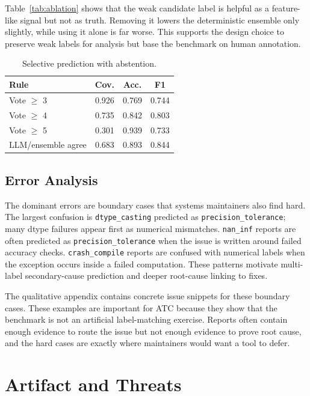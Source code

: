 \documentclass[sigplan,10pt]{acmart}
\begin{document}
Table~\ref{tab:ablation} shows that the weak candidate label is helpful as a
feature-like signal but not as truth. Removing it lowers the deterministic
ensemble only slightly, while using it alone is far worse. This supports the
design choice to preserve weak labels for analysis but base the benchmark on
human annotation.

\begin{table}[t]
\centering
\caption{Selective prediction with abstention.}
\label{tab:abstain}
\small
\begin{tabular}{@{}lccc@{}}
\toprule
Rule & Cov. & Acc. & F1 \\
\midrule
Vote $\geq$ 3 & 0.926 & 0.769 & 0.744 \\
Vote $\geq$ 4 & 0.735 & 0.842 & 0.803 \\
Vote $\geq$ 5 & 0.301 & 0.939 & 0.733 \\
LLM/ensemble agree & 0.683 & 0.893 & 0.844 \\
\bottomrule
\end{tabular}
\end{table}

\subsection{Error Analysis}

The dominant errors are boundary cases that systems maintainers also find hard.
The largest confusion is \texttt{dtype\_casting} predicted as
\texttt{precision\_tolerance}; many dtype failures appear first as numerical
mismatches. \texttt{nan\_inf} reports are often predicted as
\texttt{precision\_tolerance} when the issue is written around failed accuracy
checks. \texttt{crash\_compile} reports are confused with numerical labels when
the exception occurs inside a failed computation. These patterns motivate
multi-label secondary-cause prediction and deeper root-cause linking to fixes.

The qualitative appendix contains concrete issue snippets for these boundary
cases. These examples are important for ATC because they show that the benchmark
is not an artificial label-matching exercise. Reports often contain enough
evidence to route the issue but not enough evidence to prove root cause, and the
hard cases are exactly where maintainers would want a tool to defer.

\section{Artifact and Threats}
\end{document}
